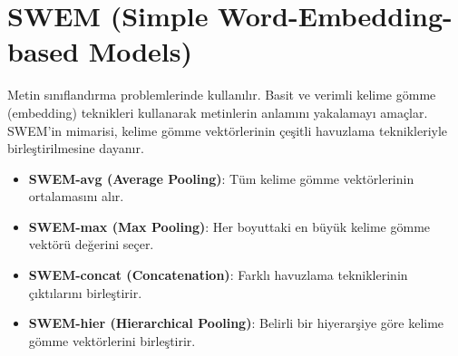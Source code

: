 \section{SWEM (Simple Word-Embedding-based Models)}
Metin sınıflandırma problemlerinde kullanılır. Basit ve verimli kelime gömme (embedding) teknikleri kullanarak metinlerin anlamını yakalamayı amaçlar. SWEM'in mimarisi, kelime gömme vektörlerinin çeşitli havuzlama teknikleriyle birleştirilmesine dayanır.

\begin{itemize}
	\item \textbf{SWEM-avg (Average Pooling)}: Tüm kelime gömme vektörlerinin ortalamasını alır.
	\item \textbf{SWEM-max (Max Pooling)}: Her boyuttaki en büyük kelime gömme vektörü değerini seçer.
	\item \textbf{SWEM-concat (Concatenation)}: Farklı havuzlama tekniklerinin çıktılarını birleştirir.
	\item \textbf{SWEM-hier (Hierarchical Pooling)}: Belirli bir hiyerarşiye göre kelime gömme vektörlerini birleştirir.
\end{itemize}

\newpage